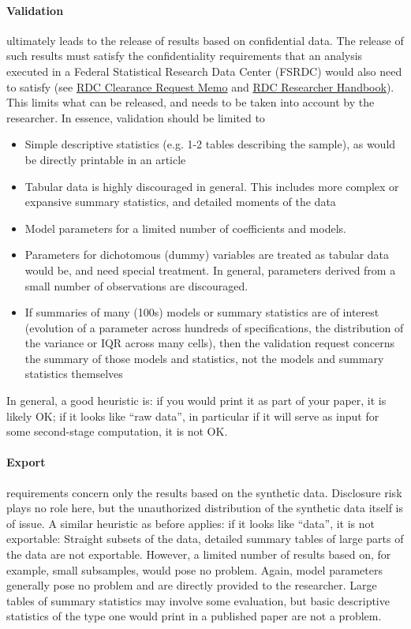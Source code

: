 \documentclass{article}
\begin{document}
\paragraph{Validation} ultimately leads to the release of results based on confidential data. The release of such results must satisfy the confidentiality requirements that an analysis executed in a Federal Statistical Research Data Center (FSRDC) would also need to satisfy (see \href{http://www.census.gov/content/dam/Census/programs-surveys/sipp/methodology/RDCDisclosureRequestMemo.pdf}{RDC Clearance Request Memo} and \href{http://www.census.gov/content/dam/Census/programs-surveys/sipp/methodology/Researcher_Handbook_20091119.pdf}{RDC Researcher Handbook}). This limits what can be released, and needs to be taken into account by the researcher. In essence, validation should be limited to
\begin{itemize}
\item Simple descriptive statistics (e.g. 1-2 tables describing the sample), as would be directly printable in an article
\item Tabular data is highly discouraged in general. This includes more complex or expansive summary statistics, and detailed moments of the data
\item Model parameters for a limited number of coefficients and models. 
\item Parameters for dichotomous (dummy) variables are treated as tabular data would be, and need special treatment. In general, parameters derived from a small number of observations are discouraged.
\item If summaries of many (100s) models or summary statistics are of interest (evolution of a parameter across hundreds of specifications, the distribution of the variance or IQR across many cells), then the validation request concerns the summary of those models and statistics, not the models and summary statistics themselves
\end{itemize}
In general, a good heuristic is: if you would print it as part of your paper, it is likely OK; if it looks like ``raw data'', in particular if it will serve as input for some second-stage computation, it is not OK.

\paragraph{Export} requirements concern only the results based on the synthetic data. Disclosure risk plays no role here, but the unauthorized distribution of the synthetic data itself is of issue. A similar heuristic as before applies: if it looks like ``data'', it is not exportable: Straight subsets of the data, detailed summary tables of large parts of the data are not exportable. However, a limited number of results based on, for example, small subsamples, would pose no problem. Again, model parameters generally pose no problem and are directly provided to the researcher. Large tables of summary statistics may involve some evaluation, but basic descriptive statistics of the type one would print in a published paper are not a problem.
\end{document}
